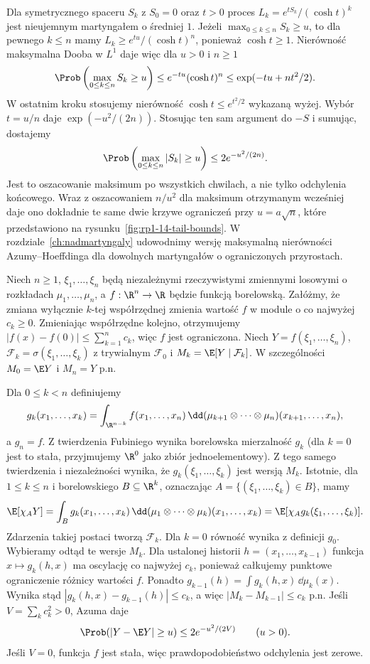 \begin{przyklad}
Dla symetrycznego spaceru $S_k$ z $S_0=0$
oraz $t>0$ proces
$L_k=e^{tS_k}/(\cosh t)^k$ jest nieujemnym
martyngałem o średniej $1$.
Jeżeli $\max_{0\leq k\leq n}S_k\geq u$, to
dla pewnego $k\leq n$ mamy
$L_k\geq e^{tu}/(\cosh t)^n$, ponieważ
$\cosh t\geq1$. Nierówność maksymalna Dooba
w $L^1$ daje więc dla $u>0$ i $n\geq1$
\[
\Prob\left(\max_{0\leq k\leq n}S_k\geq u\right)
\leq e^{-tu}(\cosh t)^n
\leq \exp(-tu+nt^2/2).
\]
W ostatnim kroku stosujemy nierówność
$\cosh t\leq e^{t^2/2}$ wykazaną wyżej.
Wybór $t=u/n$ daje $\exp(-u^2/(2n))$.
Stosując ten sam argument do $-S$ i sumując,
dostajemy
\[
\Prob\left(\max_{0\leq k\leq n}|S_k|\geq u\right)
\leq 2e^{-u^2/(2n)}.
\]
Jest to oszacowanie maksimum po wszystkich
chwilach, a nie tylko odchylenia końcowego.
Wraz z oszacowaniem $n/u^2$ dla maksimum
otrzymanym wcześniej daje ono dokładnie te same
dwie krzywe ograniczeń przy $u=a\sqrt n$,
które przedstawiono na rysunku~\ref{fig:rp1-14-tail-bounds}.
W rozdziale~\ref{ch:nadmartyngaly} udowodnimy
wersję maksymalną nierówności Azumy--Hoeffdinga
dla dowolnych martyngałów o ograniczonych przyrostach.
\end{przyklad}

\begin{przyklad}
Niech $n\geq1$, $\xi_1,\ldots,\xi_n$ będą
niezależnymi rzeczywistymi zmiennymi losowymi
o rozkładach $\mu_1,\ldots,\mu_n$, a
$f:\R^n\to\R$ będzie funkcją borelowską.
Załóżmy, że zmiana wyłącznie $k$-tej współrzędnej
zmienia wartość $f$ w module o co najwyżej
$c_k\geq0$. Zmieniając współrzędne kolejno,
otrzymujemy $|f(x)-f(0)|\leq\sum_{k=1}^nc_k$,
więc $f$ jest ograniczona.
Niech $Y=f(\xi_1,\ldots,\xi_n)$,
$\mathcal F_k=\sigma(\xi_1,\ldots,\xi_k)$
z trywialnym $\mathcal F_0$ i
$M_k=\E[Y\mid\mathcal F_k]$.
W szczególności $M_0=\E Y$ i $M_n=Y$ p.n.

Dla $0\leq k<n$ definiujemy
\[
g_k(x_1,\ldots,x_k)=
\int_{\R^{n-k}} f(x_1,\ldots,x_n)\,
\dd(\mu_{k+1}\otimes\cdots\otimes\mu_n)(x_{k+1},\ldots,x_n),
\]
a $g_n=f$. Z twierdzenia Fubiniego wynika borelowska
mierzalność $g_k$ (dla $k=0$ jest to stała,
przyjmujemy $\R^0$ jako zbiór jednoelementowy).
Z tego samego twierdzenia i niezależności
wynika, że $g_k(\xi_1,\ldots,\xi_k)$ jest wersją
$M_k$. Istotnie, dla $1\leq k\leq n$ i
borelowskiego $B\subseteq\R^k$, oznaczając
$A=\{(\xi_1,\ldots,\xi_k)\in B\}$, mamy
\[
\E[\chi_A Y]=\int_B g_k(x_1,\ldots,x_k)\,
\dd(\mu_1\otimes\cdots\otimes\mu_k)(x_1,\ldots,x_k)
=\E[\chi_A g_k(\xi_1,\ldots,\xi_k)].
\]
Zdarzenia takiej postaci tworzą $\mathcal F_k$.
Dla $k=0$ równość wynika z definicji $g_0$.
Wybieramy odtąd te wersje $M_k$.
Dla ustalonej historii $h=(x_1,\ldots,x_{k-1})$
funkcja $x\mapsto g_k(h,x)$ ma oscylację
co najwyżej $c_k$, ponieważ całkujemy
punktowe ograniczenie różnicy wartości $f$.
Ponadto $g_{k-1}(h)=\int g_k(h,x)\,\dd\mu_k(x)$.
Wynika stąd $|g_k(h,x)-g_{k-1}(h)|\leq c_k$,
a więc $|M_k-M_{k-1}|\leq c_k$ p.n.
Jeśli $V=\sum_kc_k^2>0$, Azuma daje
\[
\Prob(|Y-\E Y|\geq u)\leq2e^{-u^2/(2V)}
\qquad(u>0).
\]
Jeśli $V=0$, funkcja $f$ jest stała,
więc prawdopodobieństwo odchylenia jest zerowe.
\end{przyklad}

